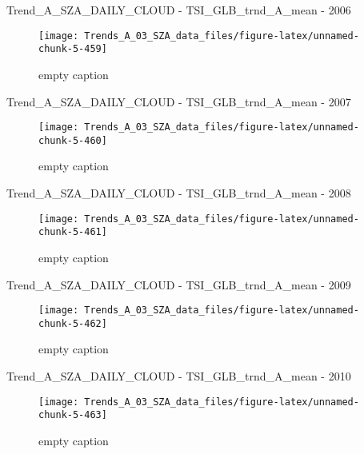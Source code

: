 \documentclass[
  10pt,
  a4paper,oneside]{article}
\begin{document}
Trend\_A\_SZA\_DAILY\_CLOUD - TSI\_GLB\_trnd\_A\_mean - 2006

\begin{figure}[!ht]

{\centering \texttt{[image: Trends\_A\_03\_SZA\_data\_files/figure-latex/unnamed-chunk-5-459]} 

}

\caption{ empty caption }\label{fig:unnamed-chunk-5-459}
\end{figure}

Trend\_A\_SZA\_DAILY\_CLOUD - TSI\_GLB\_trnd\_A\_mean - 2007

\begin{figure}[!ht]

{\centering \texttt{[image: Trends\_A\_03\_SZA\_data\_files/figure-latex/unnamed-chunk-5-460]} 

}

\caption{ empty caption }\label{fig:unnamed-chunk-5-460}
\end{figure}

Trend\_A\_SZA\_DAILY\_CLOUD - TSI\_GLB\_trnd\_A\_mean - 2008

\begin{figure}[!ht]

{\centering \texttt{[image: Trends\_A\_03\_SZA\_data\_files/figure-latex/unnamed-chunk-5-461]} 

}

\caption{ empty caption }\label{fig:unnamed-chunk-5-461}
\end{figure}

Trend\_A\_SZA\_DAILY\_CLOUD - TSI\_GLB\_trnd\_A\_mean - 2009

\begin{figure}[!ht]

{\centering \texttt{[image: Trends\_A\_03\_SZA\_data\_files/figure-latex/unnamed-chunk-5-462]} 

}

\caption{ empty caption }\label{fig:unnamed-chunk-5-462}
\end{figure}

Trend\_A\_SZA\_DAILY\_CLOUD - TSI\_GLB\_trnd\_A\_mean - 2010

\begin{figure}[!ht]

{\centering \texttt{[image: Trends\_A\_03\_SZA\_data\_files/figure-latex/unnamed-chunk-5-463]} 

}

\caption{ empty caption }\label{fig:unnamed-chunk-5-463}
\end{figure}
\end{document}
